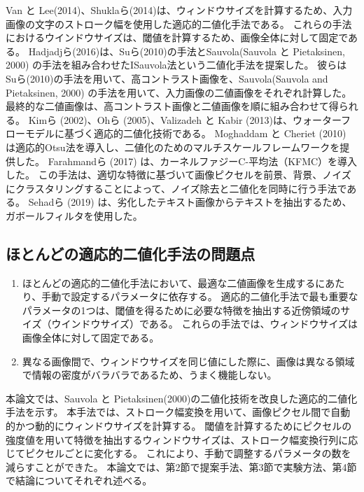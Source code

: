 \documentclass[uplatex, twocolumn,10pt]{jsarticle}
\begin{document}
Van と Lee(2014)、Shuklaら(2014)は、ウィンドウサイズを計算するため、入力画像の文字のストローク幅を使用した適応的二値化手法である。
これらの手法におけるウインドウサイズは、閾値を計算するため、画像全体に対して固定である。
Hadjadjら(2016)は、Suら(2010)の手法とSauvola(Sauvola と Pietaksinen, 2000) の手法を組み合わせたISauvola法という二値化手法を提案した。
彼らは Suら(2010)の手法を用いて、高コントラスト画像を、Sauvola(Sauvola and Pietaksinen, 2000) の手法を用いて、入力画像の二値画像をそれぞれ計算した。
最終的な二値画像は、高コントラスト画像と二値画像を順に組み合わせて得られる。
Kimら (2002)、Ohら (2005)、Valizadeh と Kabir (2013)は、ウォーターフローモデルに基づく適応的二値化技術である。
Moghaddam と Cheriet (2010) は適応的Otsu法を導入し、二値化のためのマルチスケールフレームワークを提供した。
Farahmandら (2017) は、カーネルファジーC-平均法（KFMC）を導入した。
この手法は、適切な特徴に基づいて画像ピクセルを前景、背景、ノイズにクラスタリングすることによって、ノイズ除去と二値化を同時に行う手法である。
Sehadら (2019) は、劣化したテキスト画像からテキストを抽出するため、ガボールフィルタを使用した。


\subsection{ほとんどの適応的二値化手法の問題点}

\begin{enumerate}[label=(\arabic*)]
    \item ほとんどの適応的二値化手法において、最適な二値画像を生成するにあたり、手動で設定するパラメータに依存する。
          適応的二値化手法で最も重要なパラメータの1つは、閾値を得るために必要な特徴を抽出する近傍領域のサイズ（ウインドウサイズ）である。
          これらの手法では、ウィンドウサイズは画像全体に対して固定である。
    \item 異なる画像間で、ウィンドウサイズを同じ値にした際に、画像は異なる領域で情報の密度がバラバラであるため、うまく機能しない。
\end{enumerate}

本論文では、Sauvola と Pietaksinen(2000)の二値化技術を改良した適応的二値化手法を示す。
本手法では、ストローク幅変換を用いて、画像ピクセル間で自動的かつ動的にウィンドウサイズを計算する。
閾値を計算するためにピクセルの強度値を用いて特徴を抽出するウィンドウサイズは、ストローク幅変換行列に応じてピクセルごとに変化する。
これにより、手動で調整するパラメータの数を減らすことができた。
本論文では、第2節で提案手法、第3節で実験方法、第4節で結論についてそれぞれ述べる。
\end{document}

